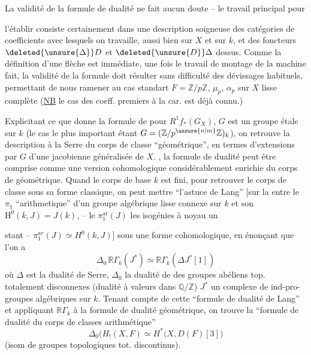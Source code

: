 La validité de la formule de dualité ne fait aucun doute -- le travail principal pour

l'établir consiste certainement dans une description soigneuse des catégories de coefficients avec lesquels on travaille, aussi bien sur $X$ et sur $k$, et des foncteurs $\deleted{\unsure{\Delta}}D$ et $\deleted{\unsure{D}}\Delta$ dessus. Comme la définition d'une flèche est immédiate, une fois le travail de montage de la machine fait, la validité de la formule doit résulter sans difficulté des dévissages habituels, permettant de nous ramener au cas standart $F=\mathbb{Z}/p\mathbb{Z}$, $\mu_p$, $\alpha_p$ sur $X$ lisse complète (\uline{NB} le cas des coeff. premiers à la car. est déjà connu.)

\noindent{}Explicitant ce que donne la formule de  pour $R^1f_*(G_X)$,  $G$ est un groupe  étale sur $k$ (le cas le plus important étant $G=(\mathbb{Z}/p^{\unsure{n|m}}\mathbb{Z})_k$), on retrouve la description à la Serre du corps de classe ``géométrique'', en termes d'extensions par $G$ d'une jacobienne généralisée de $X$. , la formule de dualité peut être comprise comme une version cohomologique considérablement enrichie du corps de  géométrique. Quand le corps de base $k$ est fini, pour retrouver le corps de \unsure{:} classe sous sa forme classique, on peut mettre ``l'astuce de Lang'' [sur la  entre \unsure{,} le $\pi_1$ ``arithmetique'' d'un groupe algébrique  lisse connexe  sur $k$ et son $\mathrm{H}^{0}(k,J)=J(k)$, -- le $\pi_1^{\mathrm{ar}}(J)$  les isogénies  à noyau un  

stant -- $\pi_1^{ar}(J)\simeq H^0(k,J)\bigr]$ sous une forme cohomologique, en énonçant que l'on a
\[
\Delta_0\,\mathbb{R}\Gamma_k(J^*)\simeq\mathbb{R}\Gamma_{k}(\Delta J^*[1])
\]
où $\Delta$ est la dualité de Serre, $\Delta_0$ la dualité de  des groupes abéliens top. totalement disconnexes (dualité à valeurs dans $\mathbb{Q}/\mathbb{Z}$) $J^*$ un complexe de ind-pro-groupes algébriques sur $k$. Tenant compte de cette ``formule de dualité de Lang'' et appliquant $\mathbb{R}\Gamma_{k}$ à la formule de dualité  géométrique, on trouve la ``formule de dualité du corps de classes arithmétique''
\[
\boxed{\Delta_0\bigl(H_!(X,F)\simeq H^*\bigl(X,D(F)[3]\bigr)}
\]
(isom de groupes topologiques tot. discontinus).

